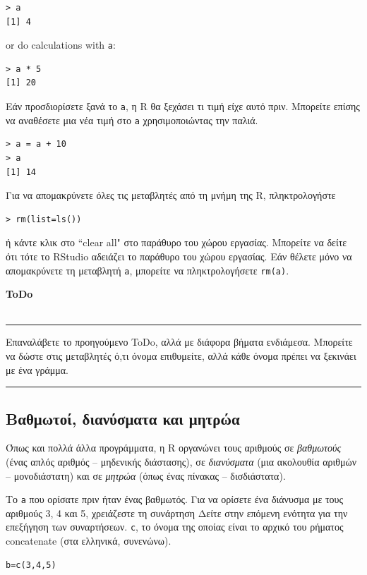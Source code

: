 \documentclass[a4paper,10pt,twocolumn]{article}
\makeatletter
\newenvironment{ToDo} {
  \begin{flushright}
    \hfill
    \begin{minipage}{0.9\columnwidth}
    \textsf{\textbf{ToDo}} \\
      \vspace{-0.7cm}\\
      {\color{Gray}\rule[-0.05cm]{\columnwidth}{1.5pt}}} {
      {\color{Gray}\rule[0.3cm]{\columnwidth}{1.5pt}}
    \end{minipage}
    \vspace{0.3cm}
  \end{flushright}
  }
\let\SF@@footnote\footnote
\def\footnote{\ifx\protect\@typeset@protect
 \expandafter\SF@@footnote
 \else
 \expandafter\SF@gobble@opt
 \fi
}
\edef\SF@gobble@opt{\noexpand\protect
 \expandafter\noexpand\csname SF@gobble@opt \endcsname}
\makeatother
\begin{document}
\begin{Verbatim}[frame=single,gobble=0]
> a 
[1] 4
\end{Verbatim}
or do calculations with \texttt{a}: 

\begin{Verbatim}[frame=single,gobble=0]
> a * 5
[1] 20
\end{Verbatim}

Εάν προσδιορίσετε ξανά το \texttt{a}, η R θα ξεχάσει τι τιμή είχε αυτό πριν. Μπορείτε επίσης να αναθέσετε μια
νέα τιμή στο \texttt{a} χρησιμοποιώντας την παλιά.

\begin{Verbatim}[frame=single,gobble=0]
> a = a + 10
> a
[1] 14
\end{Verbatim}

Για να απομακρύνετε όλες τις μεταβλητές από τη μνήμη της R, πληκτρολογήστε
\begin{Verbatim}[frame=single,gobble=0]
> rm(list=ls())
\end{Verbatim}
ή κάντε κλικ στο ``clear all" στο παράθυρο του χώρου εργασίας. Μπορείτε να δείτε ότι τότε το RStudio αδειάζει
το παράθυρο του χώρου εργασίας. Εάν θέλετε μόνο να απομακρύνετε τη μεταβλητή \texttt{a}, μπορείτε να
πληκτρολογήσετε \texttt{rm(a)}.

\begin{ToDo}
Επαναλάβετε το προηγούμενο ToDo, αλλά με διάφορα βήματα ενδιάμεσα. Μπορείτε να δώστε στις μεταβλητές ό,τι όνομα
επιθυμείτε, αλλά κάθε όνομα πρέπει να ξεκινάει με ένα γράμμα. \\
\end{ToDo}

\subsection{Βαθμωτοί, διανύσματα και μητρώα}

Όπως και πολλά άλλα προγράμματα, η R οργανώνει τους αριθμούς σε \emph{βαθμωτούς} (ένας απλός αριθμός --
μηδενικής διάστασης), σε \emph{διανύσματα} (μια ακολουθία αριθμών -- μονοδιάστατη) και σε \emph{μητρώα}
(όπως ένας πίνακας -- δισδιάστατα).

Το \texttt{a} που ορίσατε πριν ήταν ένας βαθμωτός. Για να ορίσετε ένα διάνυσμα με τους αριθμούς 3, 4 και 5,
χρειάζεστε τη συνάρτηση\footnote{Δείτε στην επόμενη ενότητα για την επεξήγηση των συναρτήσεων.} \texttt{c},
το όνομα της οποίας είναι το αρχικό του ρήματος concatenate (στα ελληνικά, συνενώνω). 
\begin{Verbatim}[frame=single,gobble=0]
b=c(3,4,5)
\end{Verbatim}
\end{document}
